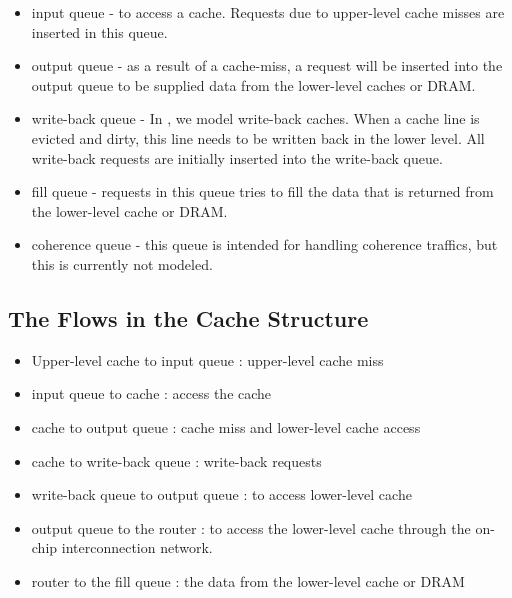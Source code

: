 \begin{itemize}
  \item input queue - to access a cache. Requests due to upper-level
  cache misses are inserted in this queue.

  \item output queue - as a result of a cache-miss, a request will be
  inserted into the output queue to be supplied data from the
  lower-level caches or DRAM.

  \item write-back queue - In \SIM, we model write-back caches. When a
  cache line is evicted and dirty, this line needs to be written back
  in the lower level. All write-back requests are initially inserted
  into the write-back queue.

  \item fill queue - requests in this queue tries to fill the data
  that is returned from the lower-level cache or DRAM.

  \item coherence queue - this queue is intended for handling
  coherence traffics, but this is currently not modeled.
\end{itemize}


\subsection{The Flows in the Cache Structure}
\label{sec:cache-flow}

\begin{itemize}

  \item Upper-level cache to input queue : upper-level cache miss

  \item input queue to cache : access the cache

  \item cache to output queue : cache miss and lower-level cache access

  \item cache to write-back queue : write-back requests

  \item write-back queue to output queue : to access lower-level cache

  \item output queue to the router : to access the lower-level cache
  through the on-chip interconnection network.

  \item router to the fill queue : the data from the lower-level cache
  or DRAM

\end{itemize}


